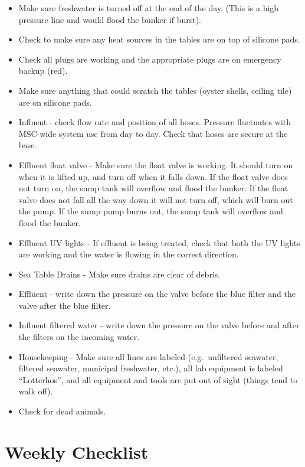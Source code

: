 \documentclass[
  letterpaper,
  DIV=11,
  numbers=noendperiod]{scrreprt}
\begin{document}
\begin{itemize}
\item
  Make sure freshwater is turned off at the end of the day. (This is a
  high pressure line and would flood the bunker if burst).
\item
  Check to make sure any heat sources in the tables are on top of
  silicone pads.
\item
  Check all plugs are working and the appropriate plugs are on emergency
  backup (red).
\item
  Make sure anything that could scratch the tables (oyster shells,
  ceiling tile) are on silicone pads.
\item
  Influent - check flow rate and position of all hoses. Pressure
  fluctuates with MSC-wide system use from day to day. Check that hoses
  are secure at the base.
\item
  Effluent float valve - Make sure the float valve is working. It should
  turn on when it is lifted up, and turn off when it falls down. If the
  float valve does not turn on, the sump tank will overflow and flood
  the bunker. If the float valve does not fall all the way down it will
  not turn off, which will burn out the pump. If the sump pump burns
  out, the sump tank will overflow and flood the bunker.
\item
  Effluent UV lights - If effluent is being treated, check that both the
  UV lights are working and the water is flowing in the correct
  direction.
\item
  Sea Table Drains - Make sure drains are clear of debris.
\item
  Effluent - write down the pressure on the valve before the blue filter
  and the valve after the blue filter.
\item
  Influent filtered water - write down the pressure on the valve before
  and after the filters on the incoming water.
\item
  Housekeeping - Make sure all lines are labeled (e.g.~unfiltered
  seawater, filtered seawater, municipal freshwater, etc.), all lab
  equipment is labeled ``Lotterhos'', and all equipment and tools are
  put out of sight (things tend to walk off).
\item
  Check for dead animals.
\end{itemize}

\hypertarget{weekly-checklist}{%
\section*{\texorpdfstring{\textbf{Weekly
Checklist}}{Weekly Checklist}}\label{weekly-checklist}}
\end{document}

